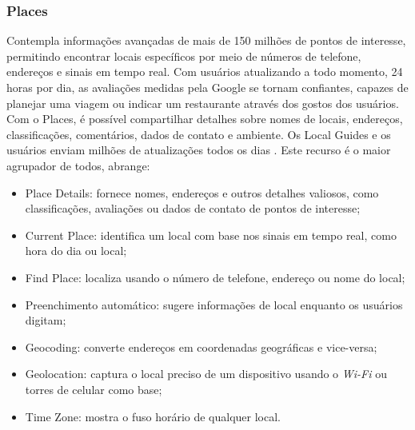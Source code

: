 \subsubsection{Places}
Contempla informações avançadas de mais de 150 milhões de pontos de interesse, permitindo encontrar locais específicos por meio de números de telefone, endereços e sinais em tempo real. Com usuários atualizando a todo momento, 24 horas por dia, as avaliações medidas pela Google se tornam confiantes, capazes de planejar uma viagem ou indicar um restaurante através dos gostos dos usuários. Com o Places, é possível compartilhar detalhes sobre nomes de locais, endereços, classificações, comentários, dados de contato e ambiente. Os Local Guides e os usuários enviam milhões de atualizações todos os dias \cite{google:2019}. Este recurso é o maior agrupador de todos, abrange:

\begin{itemize}
    \item Place Details: fornece nomes, endereços e outros detalhes valiosos, como classificações, avaliações ou dados de contato de pontos de interesse;
    \item Current Place: identifica um local com base nos sinais em tempo real, como hora do dia ou local;
    \item Find Place: localiza usando o número de telefone, endereço ou nome do local;
    \item Preenchimento automático: sugere informações de local enquanto os usuários digitam;
    \item Geocoding: converte endereços em coordenadas geográficas e vice-versa;
    \item Geolocation: captura o local preciso de um dispositivo usando o \textit{Wi-Fi} ou torres de celular como base;
    \item Time Zone: mostra o fuso horário de qualquer local.
\end{itemize}